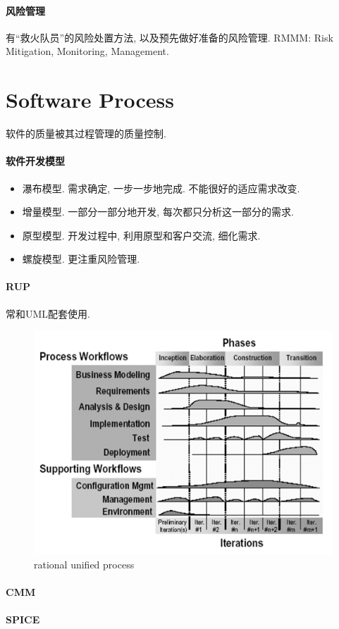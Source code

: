 \documentclass{ctexart}
\begin{document}
\paragraph{风险管理} 有``救火队员''的风险处置方法, 以及预先做好准备的风险管理.
    RMMM: Risk Mitigation, Monitoring, Management.

\section{Software Process}
    软件的质量被其过程管理的质量控制.
\paragraph{软件开发模型}
    \begin{itemize}
        \item 瀑布模型. 需求确定, 一步一步地完成. 不能很好的适应需求改变.
        \item 增量模型. 一部分一部分地开发, 每次都只分析这一部分的需求.
        \item 原型模型. 开发过程中, 利用原型和客户交流, 细化需求.
        \item 螺旋模型. 更注重风险管理.
    \end{itemize}
\paragraph{RUP} 常和UML配套使用.
    \begin{figure}[ht!]
        \centering
        \includegraphics[width=\textwidth, height=\textheight, keepaspectratio]{rup.png}
        \caption{rational unified process}
    \end{figure}
\paragraph{CMM}
\paragraph{SPICE}
\end{document}
